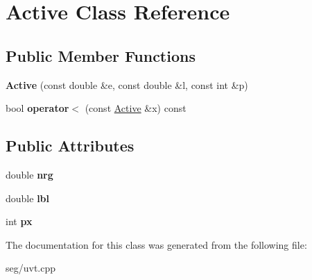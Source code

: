 \hypertarget{class_active}{\section{Active Class Reference}
\label{class_active}
}
\subsection*{Public Member Functions}
\begin{DoxyCompactItemize}
\item 
\hypertarget{class_active_a1ddd274e6e9b3a44e4ce6bbd91b2e88b}{{\bfseries Active} (const double \&e, const double \&l, const int \&p)}\label{class_active_a1ddd274e6e9b3a44e4ce6bbd91b2e88b}

\item 
\hypertarget{class_active_a6244df0e860a17ff536fea2e269267ba}{bool {\bfseries operator$<$} (const \hyperlink{class_active}{Active} \&x) const }\label{class_active_a6244df0e860a17ff536fea2e269267ba}

\end{DoxyCompactItemize}
\subsection*{Public Attributes}
\begin{DoxyCompactItemize}
\item 
\hypertarget{class_active_ab15a6be68f991b8eb03dd1cae2ff6fe1}{double {\bfseries nrg}}\label{class_active_ab15a6be68f991b8eb03dd1cae2ff6fe1}

\item 
\hypertarget{class_active_a33e5f852c3c33cc8a1f681873592cffe}{double {\bfseries lbl}}\label{class_active_a33e5f852c3c33cc8a1f681873592cffe}

\item 
\hypertarget{class_active_a4d3a99bd085ffea71f0b65719ad83b8c}{int {\bfseries px}}\label{class_active_a4d3a99bd085ffea71f0b65719ad83b8c}

\end{DoxyCompactItemize}


The documentation for this class was generated from the following file\-:\begin{DoxyCompactItemize}
\item 
seg/uvt.\-cpp\end{DoxyCompactItemize}
